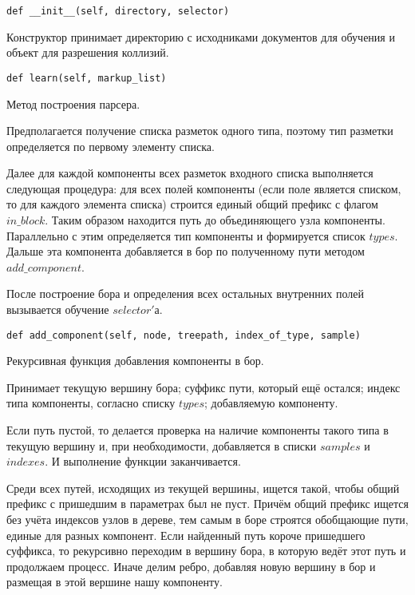 \begin{lstlisting}
def __init__(self, directory, selector)
\end{lstlisting}
Конструктор принимает директорию с исходниками документов для обучения и объект для разрешения коллизий.
\\

\begin{lstlisting}
def learn(self, markup_list)
\end{lstlisting}
Метод построения парсера.

Предполагается получение списка разметок одного типа, поэтому тип разметки определяется по первому элементу списка.

Далее для каждой компоненты всех разметок входного списка выполняется следующая процедура: для всех полей компоненты (если поле является списком, то для каждого элемента списка) строится единый общий префикс с флагом $in\_block$. Таким образом находится путь до объединяющего узла компоненты. Параллельно с этим определяется тип компоненты и формируется список $types$. Дальше эта компонента добавляется в бор по полученному пути методом $add\_component$.

После построение бора и определения всех остальных внутренних полей вызывается обучение $selector'$а.
\\

\begin{lstlisting}
def add_component(self, node, treepath, index_of_type, sample)
\end{lstlisting}
Рекурсивная функция добавления компоненты в бор.

Принимает текущую вершину бора; суффикс пути, который ещё остался; индекс типа компоненты, согласно списку $types$; добавляемую компоненту.

Если путь пустой, то делается проверка на наличие компоненты такого типа в текущую вершину и, при необходимости, добавляется в списки $samples$ и $indexes$. И выполнение функции заканчивается.

Среди всех путей, исходящих из текущей вершины, ищется такой, чтобы общий префикс с пришедшим в параметрах был не пуст. Причём общий префикс ищется без учёта индексов узлов в дереве, тем самым в боре строятся обобщающие пути, единые для разных компонент. Если найденный путь короче пришедшего суффикса, то рекурсивно переходим в вершину бора, в которую ведёт этот путь и продолжаем процесс. Иначе делим ребро, добавляя новую вершину в бор и размещая в этой вершине нашу компоненту.

